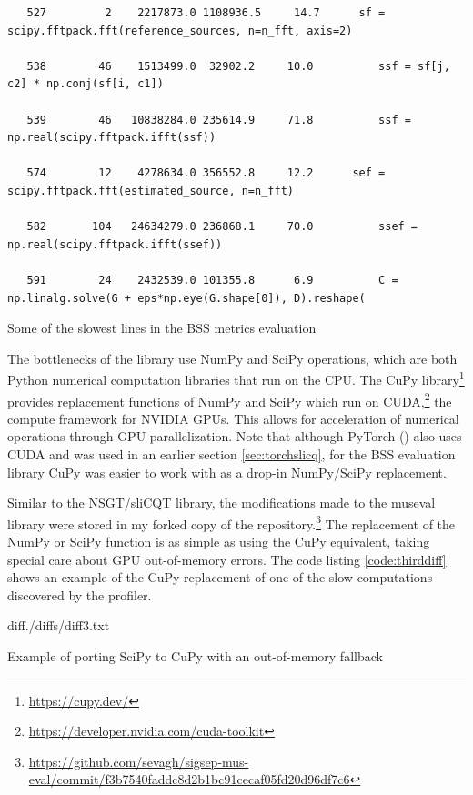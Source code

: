 \documentclass[report.tex]{subfiles}
\begin{document}
\begin{listing}[h]
  \centering
\begin{verbatim}
   527         2    2217873.0 1108936.5     14.7      sf = scipy.fftpack.fft(reference_sources, n=n_fft, axis=2)

   538        46    1513499.0  32902.2     10.0          ssf = sf[j, c2] * np.conj(sf[i, c1])

   539        46   10838284.0 235614.9     71.8          ssf = np.real(scipy.fftpack.ifft(ssf))

   574        12    4278634.0 356552.8     12.2      sef = scipy.fftpack.fft(estimated_source, n=n_fft)

   582       104   24634279.0 236868.1     70.0          ssef = np.real(scipy.fftpack.ifft(ssef))

   591        24    2432539.0 101355.8      6.9          C = np.linalg.solve(G + eps*np.eye(G.shape[0]), D).reshape(
\end{verbatim}
  \caption{Some of the slowest lines in the BSS metrics evaluation}
  \label{lst:slowbssprofile}
\end{listing}

The bottlenecks of the library use NumPy and SciPy operations, which are both Python numerical computation libraries that run on the CPU. The CuPy library\footnote{\url{https://cupy.dev/}} provides replacement functions of NumPy and SciPy which run on CUDA,\footnote{\url{https://developer.nvidia.com/cuda-toolkit}} the compute framework for NVIDIA GPUs. This allows for acceleration of numerical operations through GPU parallelization. Note that although PyTorch (\cite{pytorch}) also uses CUDA and was used in an earlier section \ref{sec:torchslicq}, for the BSS evaluation library CuPy was easier to work with as a drop-in NumPy/SciPy replacement.

Similar to the NSGT/sliCQT library, the modifications made to the museval library were stored in my forked copy of the repository.\footnote{\url{https://github.com/sevagh/sigsep-mus-eval/commit/f3b7540faddc8d2b1bc91cecaf05fd20d96df7c6}} The replacement of the NumPy or SciPy function is as simple as using the CuPy equivalent, taking special care about GPU out-of-memory errors. The code listing \ref{code:thirddiff} shows an example of the CuPy replacement of one of the slow computations discovered by the profiler.

\begin{listing}[ht]
  \centering
\begin{inputminted}[linenos,breaklines,frame=single,fontsize=\scriptsize]{diff}{./diffs/diff3.txt}
\end{inputminted}
  \caption{Example of porting SciPy to CuPy with an out-of-memory fallback}
  \label{code:thirddiff}
\end{listing}
\end{document}
